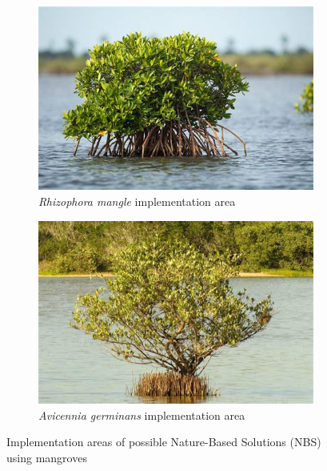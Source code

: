 \begin{figure}[H]
    \centering
    \begin{subfigure}{0.48\textwidth}
        \centering
        \includegraphics[width=\linewidth]{figures/ch8/mangrove1.jpeg}
        \caption{\textit{Rhizophora mangle} implementation area}
        \label{fig:Rhizophora mangle}
    \end{subfigure}
    \hfill
    \begin{subfigure}{0.48\textwidth}
        \centering
        \includegraphics[width=\linewidth]{figures/ch8/mangrove2.jpeg}
        \caption{\textit{Avicennia germinans} implementation area}
        \label{fig:Avicennia germinans}
    \end{subfigure}
    \caption{Implementation areas of possible Nature-Based Solutions (NBS) using mangroves}
    \label{fig:mangrove_nbs}
\end{figure}


